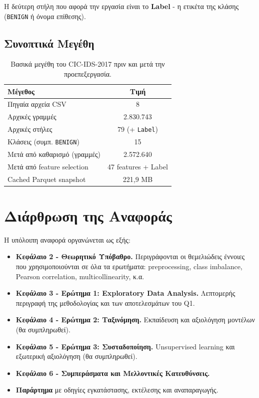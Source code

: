 \documentclass[12pt,a4paper,twoside]{book}
\begin{document}
Η δεύτερη στήλη που αφορά την εργασία είναι το \textbf{Label} - η ετικέτα
της κλάσης (\texttt{BENIGN} ή όνομα επίθεσης).

\subsection{Συνοπτικά Μεγέθη}

\begin{table}[H]
    \centering
    \begin{tabular}{lc}
        \toprule
        \textbf{Μέγεθος}                 & \textbf{Τιμή}           \\
        \midrule
        Πηγαία αρχεία CSV                & 8                       \\
        Αρχικές γραμμές                  & 2.830.743               \\
        Αρχικές στήλες                   & 79 (+ \texttt{Label})   \\
        Κλάσεις (συμπ. \texttt{BENIGN})  & 15                      \\
        Μετά από καθαρισμό (γραμμές)     & 2.572.640               \\
        Μετά από feature selection       & 47 features + Label     \\
        Cached Parquet snapshot          & 221,9 MB                \\
        \bottomrule
    \end{tabular}
    \caption{Βασικά μεγέθη του CIC-IDS-2017 πριν και μετά την
    προεπεξεργασία.}\label{tab:dataset_sizes}
\end{table}

\section{Διάρθρωση της Αναφοράς}

Η υπόλοιπη αναφορά οργανώνεται ως εξής:

\begin{itemize}
    \item \textbf{Κεφάλαιο 2 - Θεωρητικό Υπόβαθρο.} Περιγράφονται οι
    θεμελιώδεις έννοιες που χρησιμοποιούνται σε όλα τα ερωτήματα:
    preprocessing, class imbalance, Pearson correlation,
    multicollinearity, κ.α.

    \item \textbf{Κεφάλαιο 3 - Ερώτημα 1: Exploratory Data Analysis.}
    Λεπτομερής περιγραφή της μεθοδολογίας και των αποτελεσμάτων του Q1.

    \item \textbf{Κεφάλαιο 4 - Ερώτημα 2: Ταξινόμηση.} Εκπαίδευση και
    αξιολόγηση μοντέλων (θα συμπληρωθεί).

    \item \textbf{Κεφάλαιο 5 - Ερώτημα 3: Συσταδοποίηση.} Unsupervised
    learning και εξωτερική αξιολόγηση (θα συμπληρωθεί).

    \item \textbf{Κεφάλαιο 6 - Συμπεράσματα και Μελλοντικές Κατευθύνσεις.}

    \item \textbf{Παράρτημα} με οδηγίες εγκατάστασης, εκτέλεσης και
    αναπαραγωγής.
\end{itemize}
\end{document}
